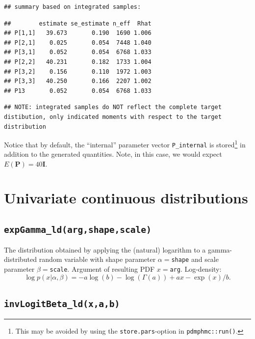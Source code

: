 \documentclass[
]{book}
\begin{document}
\begin{verbatim}
## summary based on integrated samples:
\end{verbatim}

\begin{verbatim}
##        estimate se_estimate n_eff  Rhat
## P[1,1]   39.673       0.190  1690 1.006
## P[2,1]    0.025       0.054  7448 1.040
## P[3,1]    0.052       0.054  6768 1.033
## P[2,2]   40.231       0.182  1733 1.004
## P[3,2]    0.156       0.110  1972 1.003
## P[3,3]   40.250       0.166  2207 1.002
## P13       0.052       0.054  6768 1.033
\end{verbatim}

\begin{verbatim}
## NOTE: integrated samples do NOT reflect the complete target distibution, only indicated moments with respect to the target distribution
\end{verbatim}

Notice that by default, the ``internal'' parameter vector \texttt{P\_internal} is stored\footnote{This may be avoided by using the \texttt{store.pars}-option in \texttt{pdmphmc::run()}.} in addition to the generated quantities. Note, in this case, we would expect \(E(\mathbf P)=40 \mathbf I\).

\hypertarget{univariate-continuous-distributions}{%
\section{Univariate continuous distributions}\label{univariate-continuous-distributions}}

\hypertarget{expgamma_ldargshapescale}{%
\subsection{\texorpdfstring{\texttt{expGamma\_ld(arg,shape,scale)}}{expGamma\_ld(arg,shape,scale)}}\label{expgamma_ldargshapescale}}

The distribution obtained by applying the (natural) logarithm to a gamma-distributed random variable with shape parameter \(\alpha=\)\texttt{shape} and scale parameter \(\beta=\)\texttt{scale}. Argument of resulting PDF \(x=\)\texttt{arg}. Log-density:
\[
\log p(x|\alpha,\beta) = -a\log(b) - \log(\Gamma(a)) + ax - \exp(x)/b.
\]

\hypertarget{invlogitbeta_ldxab}{%
\subsection{\texorpdfstring{\texttt{invLogitBeta\_ld(x,a,b)}}{invLogitBeta\_ld(x,a,b)}}\label{invlogitbeta_ldxab}}
\end{document}

